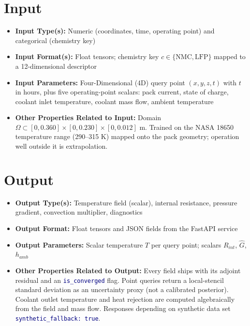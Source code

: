 \documentclass[10.5pt,a4paper]{article}
\newcommand{\code}[1]{\texttt{\textcolor{navy}{#1}}}
\begin{document}
\section*{Input}
\begin{itemize}
  \item \textbf{Input Type(s):} Numeric (coordinates, time, operating point) and categorical (chemistry key)
  \item \textbf{Input Format(s):} Float tensors; chemistry key $c\in\{\text{NMC},\text{LFP}\}$ mapped to a 12-dimensional descriptor
  \item \textbf{Input Parameters:} Four-Dimensional (4D) query point $(x,y,z,t)$ with $t$ in hours, plus five operating-point scalars: pack current, state of charge, coolant inlet temperature, coolant mass flow, ambient temperature
  \item \textbf{Other Properties Related to Input:} Domain $\Omega\subset[0,0.360]\times[0,0.230]\times[0,0.012]$ m. Trained on the NASA 18650 temperature range (290--315 K) mapped onto the pack geometry; operation well outside it is extrapolation.
\end{itemize}

\section*{Output}
\begin{itemize}
  \item \textbf{Output Type(s):} Temperature field (scalar), internal resistance, pressure gradient, convection multiplier, diagnostics
  \item \textbf{Output Format:} Float tensors and JSON fields from the FastAPI service
  \item \textbf{Output Parameters:} Scalar temperature $T$ per query point; scalars $R_{int}$, $\hat G$, $h_{amb}$
  \item \textbf{Other Properties Related to Output:} Every field ships with its adjoint residual and an \code{is\_converged} flag. Point queries return a local-stencil standard deviation as an uncertainty proxy (not a calibrated posterior). Coolant outlet temperature and heat rejection are computed algebraically from the field and mass flow. Responses depending on synthetic data set \code{synthetic\_fallback: true}.
\end{itemize}

\end{document}
